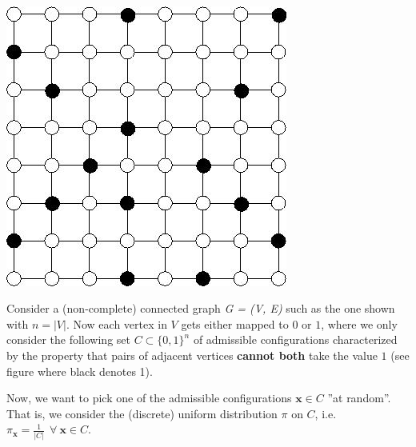 \documentclass[addpoints,11pt,a4paper]{exam}
\begin{document}
\begin{questions}
 \\ 
\begin{minipage}{0.35\textwidth}
 \begin{center}
\includegraphics[scale=0.3]{hardcore.jpg}     
 \end{center}
 \end{minipage}
 \begin{minipage}{0.6\textwidth}
Consider a (non-complete) connected graph \textit{G = (V, E)} such as the one shown with $n=|V|$. Now each vertex in $V$ gets either mapped to $0$ or $1$, where we only consider the following set $C \subset \{0,1\}^n$ of admissible configurations characterized by the property that pairs of adjacent vertices {\bf cannot both} take the value $1$ (see figure where black denotes 1).

Now, we want to pick one of the admissible configurations ${\mathbf x} \in C$ ''at random''. That is, we consider the (discrete) uniform distribution $\pi$ on $C$, i.e. $\pi_{\mathbf{x}}=\frac{1}{|C|} ~~\forall~{\mathbf{x}} \in C$. 
 \end{minipage}
\end{questions}
\end{document}
